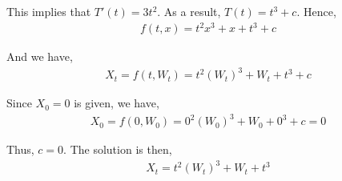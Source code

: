 \documentclass[12pt]{article}
\newenvironment{problem}[2][Problem]{\begin{trivlist}
\item[\hskip \labelsep {\bfseries #1}\hskip \labelsep {\bfseries #2.}]}{\end{trivlist}}
\begin{document}
This implies that $T'(t) = 3t^2$. As a result, $T(t) = t^3 + c$. Hence,
\begin{align*}
f(t,x) = t^2x^3 + x + t^3 + c
\end{align*}

And we have,
\begin{align*}
X_t = f(t, W_t) = t^2(W_t)^3 + W_t + t^3 + c
\end{align*}

Since $X_0 = 0$ is given, we have,
\begin{align*}
X_0 = f(0, W_0) = 0^2(W_0)^3 + W_0 + 0^3 + c = 0
\end{align*}

Thus, $c = 0$. The solution is then,
\begin{align*}
X_t = t^2(W_t)^3 + W_t + t^3
\end{align*}

\begin{problem}{27}
\end{problem}
\end{document}
